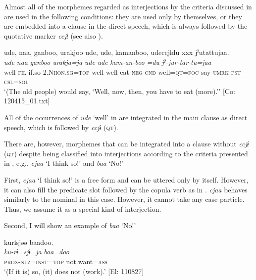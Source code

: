   Almost all of the morphemes regarded as interjections by the criteria discussed in  are used in the following conditions: they are used only by themselves, or they are embedded into a clause in the direct speech, which is always followed by the quotative marker \textit{ccjɨ} (see also ).

\ea{} \label{ex:4.57}
\glll   ude,  naa,  ganboo,  urakjoo  ude,  ude,  kamanboo,   udeccjɨdu  xxx  jˀutattujaa.\\
    \textit{ude}  \textit{naa}  \textit{ganboo}  \textit{urakja=ja}  \textit{ude}  \textit{ude}  \textit{kam-an-boo}   \textit{=du}    \textit{jˀ-jur-tar-tu=jaa}\\
    well  \textsc{fil}  if.so  2.N\textsc{hon}.\textsc{sg}=\textsc{top}  well  well  eat-\textsc{neg}-\textsc{cnd}                                                            well=\textsc{qt}=\textsc{foc}    say-\textsc{umrk}-\textsc{pst}-\textsc{csl}=\textsc{sol}\\
  \glt     ‘(The old people) would say, ‘Well, now, then, you have to eat (more).’’ [Co: 120415\_01.txt]
  \z

All of the occurrences of \textit{ude} ‘well’ in  are integrated in the main clause as direct speech, which is followed by \textit{ccjɨ} (\textsc{qt}).

There are, however, morphemes that can be integrated into a clause without \textit{ccjɨ} (\textsc{qt}) despite being classified into interjections according to the criteria presented in , e.g., \textit{cjaa} ‘I think so!’ and \textit{baa} ‘No!’

First, \textit{cjaa} ‘I think so!’ is a free form and can be uttered only by itself. However, it can also fill the predicate slot followed by the copula verb as in . \textit{cjaa} behaves similarly to the nominal in this case. However, it cannot take any case particle. Thus, we assume it as a special kind of interjection.

Second, I will show an example of \textit{baa} ‘No!’

\ea \label{ex:4.58}
\glll    kurɨsjəə  baadoo.\\
    \textit{ku-rɨ=sjɨ=ja}  \textit{baa=doo}\\
    \textsc{prox}-\textsc{nlz}=\textsc{inst}=\textsc{top}  not.want=\textsc{ass}\\
  \glt     ‘(If it is) so, (it) does not (work).’ [El: 110827]
\z

